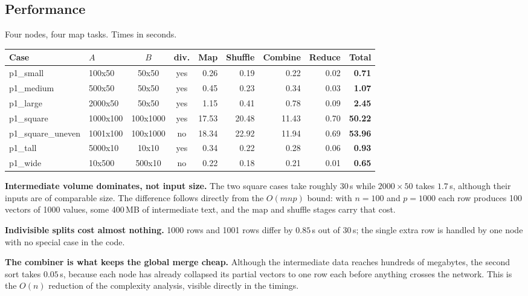 \documentclass[11pt,a4paper]{article}
\begin{document}
\subsection{Performance}
Four nodes, four map tasks. Times in seconds.

\begin{center}\small
\begin{tabular}{@{}llccrrrrr@{}}
\toprule
\textbf{Case} & \textbf{$A$} & \textbf{$B$} & \textbf{div.} & \textbf{Map} & \textbf{Shuffle} & \textbf{Combine} & \textbf{Reduce} & \textbf{Total} \\
\midrule
p1\_small & 100x50 & 50x50 & yes & 0.26 & 0.19 & 0.22 & 0.02 & \textbf{0.71} \\
p1\_medium & 500x50 & 50x50 & yes & 0.45 & 0.23 & 0.34 & 0.03 & \textbf{1.07} \\
p1\_large & 2000x50 & 50x50 & yes & 1.15 & 0.41 & 0.78 & 0.09 & \textbf{2.45} \\
p1\_square & 1000x100 & 100x1000 & yes & 17.53 & 20.48 & 11.43 & 0.70 & \textbf{50.22} \\
p1\_square\_uneven & 1001x100 & 100x1000 & no & 18.34 & 22.92 & 11.94 & 0.69 & \textbf{53.96} \\
p1\_tall & 5000x10 & 10x10 & yes & 0.34 & 0.22 & 0.28 & 0.06 & \textbf{0.93} \\
p1\_wide & 10x500 & 500x10 & no & 0.22 & 0.18 & 0.21 & 0.01 & \textbf{0.65} \\
\bottomrule
\end{tabular}
\end{center}

\textbf{Intermediate volume dominates, not input size.} The two square cases take
roughly $30$\,s while $2000\times50$ takes $1.7$\,s, although their inputs are of
comparable size. The difference follows directly from the $O(mnp)$ bound: with
$n=100$ and $p=1000$ each row produces 100 vectors of 1000 values, some 400\,MB of
intermediate text, and the map and shuffle stages carry that cost.

\textbf{Indivisible splits cost almost nothing.} 1000 rows and 1001 rows differ by
$0.85$\,s out of $30$\,s; the single extra row is handled by one node with no special
case in the code.

\textbf{The combiner is what keeps the global merge cheap.} Although the intermediate
data reaches hundreds of megabytes, the second sort takes $0.05$\,s, because each node
has already collapsed its partial vectors to one row each before anything crosses the
network. This is the $O(n)$ reduction of the complexity analysis, visible directly in
the timings.
\end{document}

